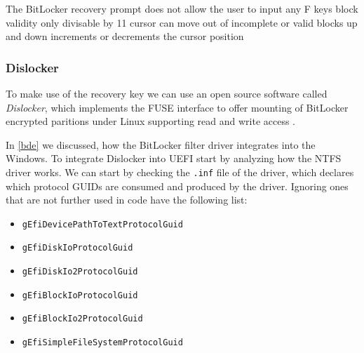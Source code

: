

The BitLocker recovery prompt does not allow the user to input any
F keys
block validity
only divisable by 11
\cite[9. BitLocker Key Recovery]{windows-internals-6-part2}
cursor can move out of incomplete or valid blocks
up and down increments or decrements the cursor position

\subsubsection{Dislocker}

To make use of the recovery key we can use an open source software called \emph{Dislocker}, which implements the \ac{FUSE} interface to offer mounting of BitLocker encrypted paritions under Linux supporting read and write access \cite{dislocker}.

In \autoref{bde} we discussed, how the BitLocker filter driver integrates into the Windows. To integrate Dislocker into \ac{UEFI} start by analyzing how the \ac{NTFS} driver works. We can start by checking the \lstinline{.inf} file of the driver, which declares which protocol \acp{GUID} are consumed and produced by the driver. Ignoring ones that are not further used in code have the following list:

\begin{itemize}
    \item \lstinline{gEfiDevicePathToTextProtocolGuid}
    \item \lstinline{gEfiDiskIoProtocolGuid}
    \item \lstinline{gEfiDiskIo2ProtocolGuid}
    \item \lstinline{gEfiBlockIoProtocolGuid}
    \item \lstinline{gEfiBlockIo2ProtocolGuid}
    \item \lstinline{gEfiSimpleFileSystemProtocolGuid}
\end{itemize}

